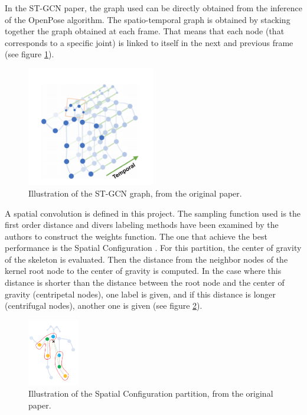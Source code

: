 \documentclass[12pt,a4paper,twoside]{article}
\begin{document}
In the ST-GCN paper, the graph used can be directly obtained from the inference of the OpenPose algorithm. The spatio-temporal graph is obtained by \guillemotleft stacking \guillemotright together the graph obtained at each frame. That means that each node (that corresponds to a specific joint) is linked to itself in the next and previous frame (see figure \ref{stgcn_graph}).

\begin{figure}
    \centering
        \includegraphics[width=0.5\textwidth]{images/stgcn_graph}
    \caption{Illustration of the ST-GCN graph, from the original paper.}
    \label{stgcn_graph}
\end{figure}

A spatial convolution is defined in this project. The sampling function used is the first order distance and divers labeling methods have been examined by the authors to construct the weights function. The one that achieve the best performance is the \guillemotleft Spatial Configuration \guillemotright. For this partition, the center of gravity of the skeleton is evaluated. Then the distance from the neighbor nodes of the kernel root node to the center of gravity is computed. In the case where this distance is shorter than the distance between the root node and the center of gravity (centripetal nodes), one label is given, and if this distance is longer (centrifugal nodes), another one is given (see figure \ref{partition_strat}).

\begin{figure}
    \centering
        \includegraphics[width=0.2\textwidth]{images/partition_strat}
    \caption{Illustration of the Spatial Configuration partition, from the original paper.}
    \label{partition_strat}
\end{figure}
\end{document}
